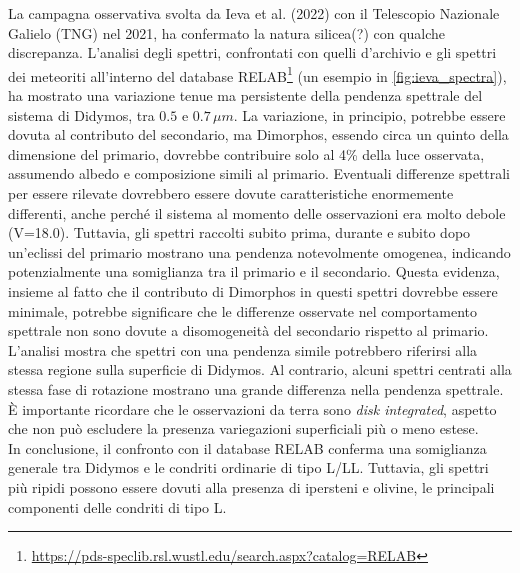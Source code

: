 \documentclass[a4paper,11pt,openright]{book}
\begin{document}
La campagna osservativa svolta da Ieva et al. (2022) con il Telescopio Nazionale Galielo (TNG) nel 2021, ha confermato la natura silicea(?) con qualche discrepanza. L'analisi degli spettri, confrontati con quelli d'archivio e gli spettri dei meteoriti all'interno del database RELAB\footnote{\href{https://pds-speclib.rsl.wustl.edu/search.aspx?catalog=RELAB}{https://pds-speclib.rsl.wustl.edu/search.aspx?catalog=RELAB}} (un esempio in \cref{fig:ieva_spectra}), ha mostrato una variazione tenue ma persistente della pendenza spettrale del sistema di Didymos, tra $0.5$ e $0.7\,\mu m$. La variazione, in principio, potrebbe essere dovuta al contributo del secondario, ma Dimorphos, essendo circa un quinto della dimensione del primario, dovrebbe contribuire solo al 4\% della luce osservata, assumendo albedo e composizione simili al primario. Eventuali differenze spettrali per essere rilevate dovrebbero essere dovute caratteristiche enormemente differenti, anche perché il sistema al momento delle osservazioni era molto debole (V=18.0). Tuttavia, gli spettri raccolti subito prima, durante e subito dopo un'eclissi del primario mostrano una pendenza notevolmente omogenea, indicando potenzialmente una somiglianza tra il primario e il secondario. Questa evidenza, insieme al fatto che il contributo di Dimorphos in questi spettri dovrebbe essere minimale, potrebbe significare che le differenze osservate nel comportamento spettrale non sono dovute a disomogeneità del secondario rispetto al primario.\\
L'analisi mostra che spettri con una pendenza simile potrebbero riferirsi alla stessa regione sulla superficie di Didymos. Al contrario, alcuni spettri centrati alla stessa fase di rotazione mostrano una grande differenza nella pendenza spettrale. È importante ricordare che le osservazioni da terra sono \textit{disk integrated}, aspetto che non può escludere la presenza variegazioni superficiali più o meno estese.\\
In conclusione, il confronto con il database RELAB conferma una somiglianza generale tra Didymos e le condriti ordinarie di tipo L/LL. Tuttavia, gli spettri più ripidi possono essere dovuti alla presenza di ipersteni e olivine, le principali componenti delle condriti di tipo L.
\end{document}
